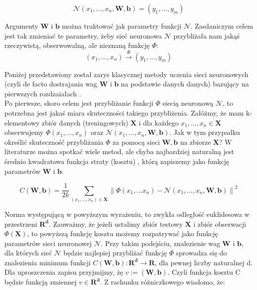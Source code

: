 \documentclass[licencjacka]{pracamgr}
\newcommand{\norm}[1]{\left\lVert#1\right\rVert}
\begin{document}
$$\mathcal{N}(x_{1},...,x_{n}, \mathbf{W}, \mathbf{b}) = (y_{1},...,y_{m})$$

Argumenty $\mathbf{W}$  i $\mathbf{b}$ można traktować jak parametry funkcji $\mathbf{\mathcal{N}}$. Zasdaniczym celem jest tak zmieniać te parametry, żeby sieć neuronowa $\mathbf{\mathcal{N}}$ przybliżała nam jakąś rzeczywistą, obserwowalną, ale nieznaną funkcję $\Phi$: 
$$ (x_{1},...,x_{n})\stackrel{\Phi}{\rightarrow}(y_{1},...,y_{m})$$

Poniżej przedstawiony został zarys klasycznej metody uczenia sieci neuronowych (czyli de facto dostrajania wag   $\mathbf{W}$  i $\mathbf{b}$ na podstawie danych danych) bazujący na pierwszych rozdzaiałach \cite{nn}.\\
 
Po pierwsze, skoro celem jest przybliżanie funkcji $\Phi$ siecią neuronową $\mathbf{\mathcal{N}}$, to potrzebna jest jakaś miara skuteczności takiego przybliżenia.  Załóżmy, że mam k-elementowy zbiór danych (treningowych) $\mathbf{X}$ i dla każdego $x_{1},...,x_{n}\in\mathbf{X}$ obserwujemy $\Phi(x_{1},...,x_{n})$ oraz $\mathbf{\mathcal{N}}(x_{1},...,x_{n}, \mathbf{W}, \mathbf{b})$. Jak w tym przypadku określić skuteczność przybliżania $\Phi$ za pomocą sieci $\mathbf{W}, \mathbf{b}$ na zbiorze $\mathbf{X}$? W literaturze można spotkać wiele metod, ale chyba najbardziej naturalną jest średnio kwadratowa funkcja straty (kosztu) , którą zapiszemy jako funkcję parametrów $\mathbf{W}$ i $\mathbf{b}$.
 
\begin{equation}
	\label{Cost_function}
	C(\mathbf{W}, \mathbf{b}) = \frac{1}{2k}\sum_{(x_{1},...,x_{n})\in\mathbf{X}}{\norm{\Phi(x_{1},...x_{n}) - \mathbf{\mathcal{N}}(x_{1},...,x_{n}, \mathbf{W}, \mathbf{b} )} } ^{2}
\end{equation}
 
 
Norma występującą w powyższym wyrażeniu, to zwykła odległość euklidesowa w przestrzeni $\mathbf{R^{d}}$. Zauważmy, że jeżeli ustalimy zbiór testowy $\mathbf{X}$ i zbiór obserwacji $\Phi(\mathbf{X})$, to powyższą funkcję kosztu możemy rozpatrywać jako funkcję parametrów sieci neuronowej $\mathbf{\mathcal{N}}$. Przy takim podejściu, znalezienie wag $\mathbf{W}$ i $\mathbf{b}$, dla których sieć $\mathbf{\mathcal{N}}$ będzie najlepiej przybliżać funkcję $\Phi$ sprowadza się do znalezienia minimum funkcji $C(\mathbf{W}, \mathbf{b}):\mathbf{R^{d}}\rightarrow\mathbf{R}$, dla pewnej liczby naturalnej d.  Dla uproszczenia zapisu przyjmijmy, żę $v:=(\mathbf{W}, \mathbf{b})$. Czyli funkcja kosztu C będzie funkcją zmiennej $v\in\mathbf{R^{d}}$. Z rachunku różniczkowego wiadomo, że:
 
\end{document}
